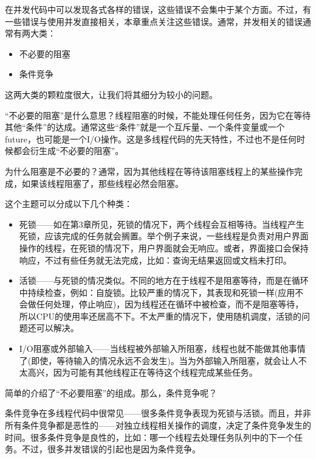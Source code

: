 
在并发代码中可以发现各式各样的错误，这些错误不会集中于某个方面。不过，有一些错误与使用并发直接相关，本章重点关注这些错误。通常，并发相关的错误通常有两大类：

\begin{itemize}
\item 不必要的阻塞
\item 条件竞争
\end{itemize}

这两大类的颗粒度很大，让我们将其细分为较小的问题。


“不必要的阻塞”是什么意思？线程阻塞的时候，不能处理任何任务，因为它在等待其他“条件”的达成。通常这些“条件”就是一个互斥量、一个条件变量或一个future，也可能是一个I/O操作。这是多线程代码的先天特性，不过也不是任何时候都会衍生成“不必要的阻塞”。

为什么阻塞是不必要的？通常，因为其他线程在等待该阻塞线程上的某些操作完成，如果该线程阻塞了，那些线程必然会阻塞。

这个主题可以分成以下几个种类：

\begin{itemize}
\item 死锁——如在第3章所见，死锁的情况下，两个线程会互相等待。当线程产生死锁，应该完成的任务就会搁置。举个例子来说，一些线程是负责对用户界面操作的线程，在死锁的情况下，用户界面就会无响应。或者，界面接口会保持响应，不过有些任务就无法完成，比如：查询无结果返回或文档未打印。
\item 活锁——与死锁的情况类似。不同的地方在于线程不是阻塞等待，而是在循环中持续检查，例如：自旋锁。比较严重的情况下，其表现和死锁一样(应用不会做任何处理，停止响应)，因为线程还在循环中被检查，而不是阻塞等待，所以CPU的使用率还居高不下。不太严重的情况下，使用随机调度，活锁的问题还可以解决。
\item I/O阻塞或外部输入——当线程被外部输入所阻塞，线程也就不能做其他事情了(即使，等待输入的情况永远不会发生)。当为外部输入所阻塞，就会让人不太高兴，因为可能有其他线程正在等待这个线程完成某些任务。
\end{itemize}

简单的介绍了“不必要阻塞”的组成。那么，条件竞争呢？


条件竞争在多线程代码中很常见——很多条件竞争表现为死锁与活锁。而且，并非所有条件竞争都是恶性的——对独立线程相关操作的调度，决定了条件竞争发生的时间。很多条件竞争是良性的，比如：哪一个线程去处理任务队列中的下一个任务。不过，很多并发错误的引起也是因为条件竞争。

